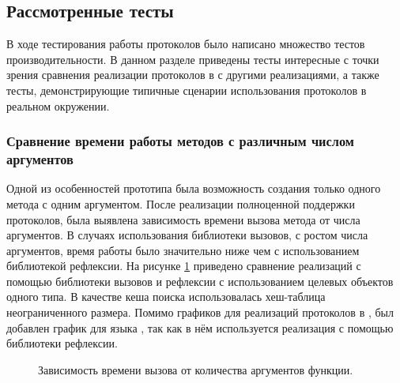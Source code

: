 \subsection{Рассмотренные тесты}
В ходе тестирования работы протоколов было написано множество тестов производительности. В данном разделе приведены тесты интересные с точки зрения сравнения реализации протоколов в  с другими реализациями, а также тесты, демонстрирующие типичные сценарии использования протоколов в реальном окружении.

\subsubsection{Сравнение времени работы методов с различным числом аргументов}
Одной из особенностей прототипа была возможность создания только одного метода с одним аргументом. После реализации полноценной поддержки протоколов, была выявлена зависимость времени вызова метода от числа аргументов. В случаях использования библиотеки вызовов, с ростом числа аргументов, время работы было значительно ниже чем с использованием библиотекой рефлексии. На рисунке \ref{plot:bench:argsCount} приведено сравнение реализаций с помощью библиотеки вызовов и рефлексии с использованием целевых объектов одного типа. В качестве кеша поиска использовалась хеш-таблица неограниченного размера. Помимо графиков для реализаций протоколов в , был добавлен график для языка , так как в нём используется реализация с помощью библиотеки рефлексии.

\begin{figure}[H]
\caption{\label{plot:bench:argsCount}Зависимость времени вызова от количества аргументов функции.}
\end{figure}

